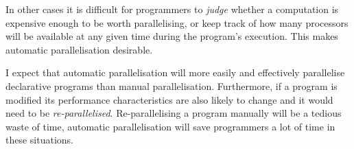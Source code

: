 In other cases it is difficult for programmers to \emph{judge} whether
a computation is expensive enough to be worth parallelising,
or keep track of how many processors will be available at any given
time during the program's execution.
This makes automatic parallelisation desirable.

I expect that automatic parallelisation will more easily and
effectively parallelise declarative programs than manual
parallelisation.
Furthermore, if a program is modified its performance characteristics
are also likely to change and it would need to be
\emph{re-parallelised}.
Re-parallelising a program manually will be a tedious waste of time,
automatic parallelisation will save programmers a lot of time in these
situations.

